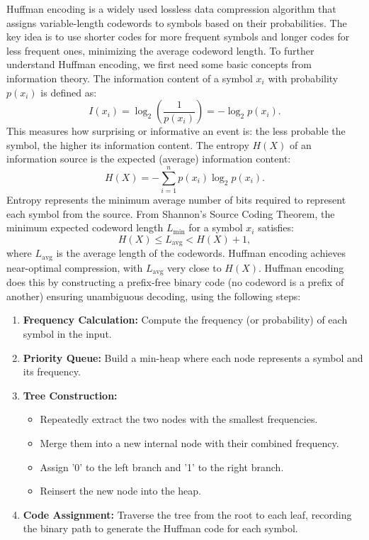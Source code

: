 Huffman encoding is a widely used lossless data compression algorithm that assigns variable-length codewords to symbols based on their probabilities. The key idea is to use shorter codes for more frequent symbols and longer codes for less frequent ones, minimizing the average codeword length. To further understand Huffman encoding, we first need some basic concepts from information theory. 
The information content of a symbol \( x_i \) with probability \( p(x_i) \) is defined as:
\[
I(x_i) = \log_2 \left( \frac{1}{p(x_i)} \right) = -\log_2 p(x_i).
\]
This measures how surprising or informative an event is: the less probable the symbol, the higher its information content.
The entropy \( H(X) \) of an information source is the expected (average) information content:
\[
H(X) = -\sum_{i=1}^{n} p(x_i) \log_2 p(x_i).
\]
Entropy represents the minimum average number of bits required to represent each symbol from the source.
From Shannon's Source Coding Theorem, the minimum expected codeword length \( L_{\text{min}} \) for a symbol \( x_i \) satisfies:
\[
H(X) \leq L_{\text{avg}} < H(X) + 1,
\]
where \( L_{\text{avg}} \) is the average length of the codewords. Huffman encoding achieves near-optimal compression, with \( L_{\text{avg}} \) very close to \( H(X) \).
Huffman encoding does this by constructing a prefix-free binary code (no codeword is a prefix of another) ensuring unambiguous decoding, using the following steps:
\begin{enumerate}
	\item \textbf{Frequency Calculation:} Compute the frequency (or probability) of each symbol in the input.
	\item \textbf{Priority Queue:} Build a min-heap where each node represents a symbol and its frequency.
	\item \textbf{Tree Construction:}  
	\begin{itemize}
		\item Repeatedly extract the two nodes with the smallest frequencies.
		\item Merge them into a new internal node with their combined frequency.
		\item Assign '0' to the left branch and '1' to the right branch.
		\item Reinsert the new node into the heap.
	\end{itemize}
	\item \textbf{Code Assignment:} Traverse the tree from the root to each leaf, recording the binary path to generate the Huffman code for each symbol.
\end{enumerate}

